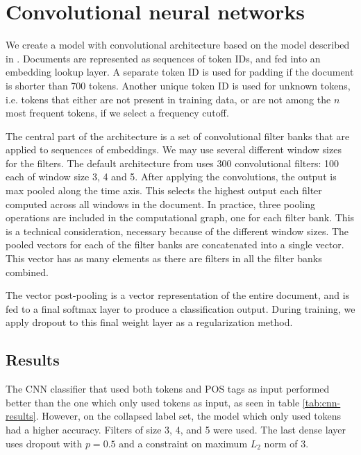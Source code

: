 \section{Convolutional neural networks}

We create a model with convolutional architecture based on the model
described in \textcite{kim2014convolutional}. Documents are represented as
sequences of token IDs, and fed into an embedding lookup layer. A separate
token ID is used for padding if the document is shorter than 700 tokens.
Another unique token ID is used for unknown tokens, i.e. tokens that either
are not present in training data, or are not among the $n$ most frequent
tokens, if we select a frequency cutoff.

The central part of the architecture is a set of convolutional filter banks
that are applied to sequences of embeddings. We may use several different
window sizes for the filters. The default architecture from
\textcite{kim2014convolutional} uses 300 convolutional filters: 100 each of
window size 3, 4 and 5. After applying the convolutions, the output is max
pooled along the time axis. This selects the highest output each filter
computed across all windows in the document. In practice, three pooling
operations are included in the computational graph, one for each filter bank.
This is a technical consideration, necessary because of the different window
sizes. The pooled vectors for each of the filter banks are concatenated into
a single vector. This vector has as many elements as there are filters in all
the filter banks combined.

The vector post-pooling is a vector representation of the entire document,
and is fed to a final softmax layer to produce a classification output.
During training, we apply dropout to this final weight layer as a
regularization method.


\subsection{Results}

The \ac{CNN} classifier that used both tokens and POS tags as input performed
better than the one which only used tokens as input, as seen in table
\ref{tab:cnn-results}. However, on the collapsed label set, the model which
only used tokens had a higher accuracy. Filters of size 3, 4, and 5 were
used. The last dense layer uses dropout with $p=0.5$ and a constraint on
maximum $L_2$ norm of 3.

